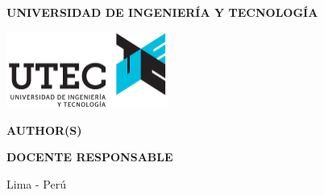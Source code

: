 \makeatletter
  \begin{titlepage}
    \let\footnotesize\small
    \let\footnoterule\relax
    \let \footnote \thanks
    \setcounter{footnote}{0}
    \null\vfil
    \begin{center}
      \setlength{\parskip}{0pt}
      \vspace{-1.5cm}
      {\large \textbf{UNIVERSIDAD DE INGENIERÍA Y TECNOLOGÍA}\par}
      \vfill
     
      \href{https://www.utec.edu.pe}{\includegraphics[height=2.5cm]{images/logo_utec.png}}\\
      \vspace{0.5cm}
      {\large \coursename \par}
      \vfil
      
      \vspace{0.5cm}
      {\Large \bf \@title \par}
      \vfill
      \smallskip
      \vspace{0.5cm}
      {\large \textbf{AUTHOR(S)}\par}
      {\large \@author \par}
      \vspace{0.5cm}

      \ifdefined\hasProfesor
        
        {\large \bf DOCENTE RESPONSABLE \par}
        \smallskip
        {\large \profesorname \par}
        \vfill

      \fi

      \vspace{1.5cm}
      {\large Lima - Perú \par}
      {\large \@date \par}
    \end{center}
    \par
    \vfil\null
  \end{titlepage}
  \makeatother
